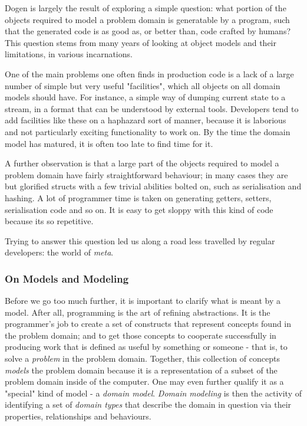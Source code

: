 \documentclass[11pt]{article}
\begin{document}
Dogen is largely the result of exploring a simple question: what
portion of the objects required to model a problem domain is
generatable by a program, such that the generated code is as good as,
or better than, code crafted by humans? This question stems from many
years of looking at object models and their limitations, in various
incarnations.

One of the main problems one often finds in production code is a lack
of a large number of simple but very useful "facilities", which all
objects on all domain models should have. For instance, a simple way
of dumping current state to a stream, in a format that can be
understood by external tools. Developers tend to add facilities like
these on a haphazard sort of manner, because it is laborious and not
particularly exciting functionality to work on. By the time the domain
model has matured, it is often too late to find time for it.

A further observation is that a large part of the objects required to
model a problem domain have fairly straightforward behaviour; in many
cases they are but glorified structs with a few trivial abilities
bolted on, such as serialisation and hashing. A lot of programmer time
is taken on generating getters, setters, serialisation code and so
on. It is easy to get sloppy with this kind of code because its so
repetitive.

Trying to answer this question led us along a road less travelled by
regular developers: the world of \emph{meta}.

\subsubsection{On Models and Modeling}
\label{sec-2-1-2}

Before we go too much further, it is important to clarify what is
meant by a model. After all, programming is the art of refining
abstractions. It is the programmer's job to create a set of constructs
that represent concepts found in the problem domain; and to get those
concepts to cooperate successfully in producing work that is defined
as useful by something or someone - that is, to solve a \emph{problem} in
the problem domain. Together, this collection of concepts \emph{models} the
problem domain because it is a representation of a subset of the
problem domain inside of the computer. One may even further qualify it
as a "special" kind of model - a \emph{domain model}. \emph{Domain modeling} is
then the activity of identifying a set of \emph{domain types} that describe
the domain in question via their properties, relationships and
behaviours.
\end{document}
